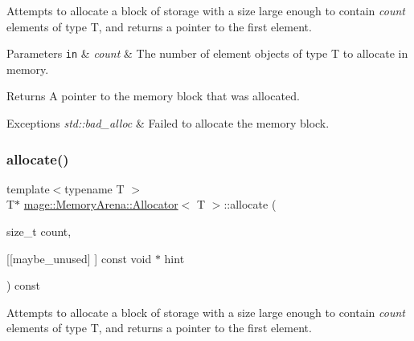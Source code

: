 Attempts to allocate a block of storage with a size large enough to contain {\itshape count} elements of type {\ttfamily T}, and returns a pointer to the first element.


\begin{DoxyParams}[1]{Parameters}
\mbox{\tt in}  & {\em count} & The number of element objects of type {\ttfamily T} to allocate in memory. \\
\hline
\end{DoxyParams}
\begin{DoxyReturn}{Returns}
A pointer to the memory block that was allocated. 
\end{DoxyReturn}

\begin{DoxyExceptions}{Exceptions}
{\em std\+::bad\+\_\+alloc} & Failed to allocate the memory block. \\
\hline
\end{DoxyExceptions}
\mbox{\label{classmage_1_1_memory_arena_1_1_allocator_a09fe7399fffff4574529ccbbe3fd8c3e}} 
\subsubsection{\texorpdfstring{allocate()}{allocate()}\hspace{0.1cm}{\footnotesize\ttfamily [2/2]}}
{\footnotesize\ttfamily template$<$typename T $>$ \\
T$\ast$ \mbox{\hyperlink{classmage_1_1_memory_arena_1_1_allocator}{mage\+::\+Memory\+Arena\+::\+Allocator}}$<$ T $>$\+::allocate (\begin{DoxyParamCaption}\item[{size\+\_\+t}]{count,  }\item[{\mbox{[}\mbox{[}maybe\+\_\+unused\mbox{]} \mbox{]} const void $\ast$}]{hint }\end{DoxyParamCaption}) const}

Attempts to allocate a block of storage with a size large enough to contain {\itshape count} elements of type {\ttfamily T}, and returns a pointer to the first element.


